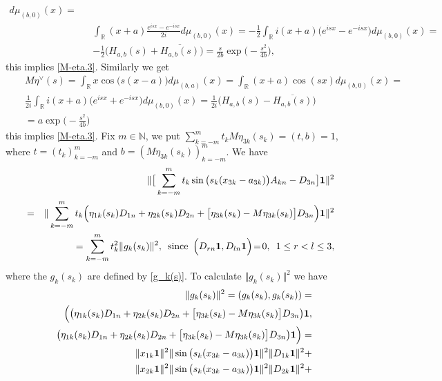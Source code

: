 \documentclass[preprint,12pt]{elsarticle}
\numberwithin{equation}{section}
\begin{document}
\begin{pf}
\begin{eqnarray*}
d\mu_{(b,0)}(x)=\\
&&
\int_{\mathbb R}(x+a)\frac{e^{isx}-e^{-isx}}{2i}d\mu_{(b,0)}(x)=
-\frac{1}{2}\int_{\mathbb R}i(x+a)\big(e^{isx}-e^{-isx}\big)d\mu_{(b,0)}(x)=\\
&&
-\frac{1}{2}\Big(H_{a,b}(s)+\overline{H_{a,b}(s)}\Big)=\frac{s}{2b}\exp\Big(-\frac{s^2}{4b}\Big),
\end{eqnarray*}
this implies \eqref{M-eta.3}.
Similarly we get 
\begin{eqnarray*}
&&
M\eta^{\vee}(s)=
\int_{\mathbb R}x\cos\big(s(x-a)\big)d\mu_{(b,a)}(x)=
\int_{\mathbb R}(x+a)\cos(sx)
d\mu_{(b,0)}(x)=\\
&&
\frac{1}{2i}\int_{\mathbb R}i(x+a)\Big(e^{isx}+e^{-isx}\Big)d\mu_{(b,0)}(x)=
\frac{1}{2i}\Big(H_{a,b}(s)-\overline{H_{a,b}(s)}\Big)\\
&&
=a\exp\Big(-\frac{s^2}{4b}\Big)
\end{eqnarray*}
this implies \eqref{M-eta.3}.
Fix $m\in {\mathbb N}$, 
we put $\sum_{k=-m}^mt_kM\eta_{3k}(s_k)=(t,b)=1$,
where $t=(t_k)_{k=-m}^m$ and $b=(M\eta_{3k}(s_k))_{k=-m}^m$. We have
%
\begin{eqnarray}
\nonumber
&& \Vert \big[\sum_{k=-m}^mt_k
\sin\big(s_k(x_{3k}-a_{3k})\big)A_{kn}
-D_{3n}\big]{\bf 1}
\Vert^2\\
\nonumber
&=&
\Vert 
\sum_{k=-m}^mt_k
\Big(\eta_{1k}(s_k)D_{1n}+\eta_{2k}(s_k)D_{2n}+\big[\eta_{3k}(s_k)-M\eta_{3k}(s_k)\big]D_{3n}\Big){\bf 1}
\Vert^2
\\
\label{eta.3}
&&
=\sum_{k=-m}^mt^2_k\Vert g_{k}(s_k)\Vert^2,\,\,\,\text{since}\,\,\,
\Big(D_{rn}{\bf 1},D_{ln}{\bf 1}\Big)\!=\!0,\,\,\,1\leq r<l\leq 3,
\end{eqnarray} 
where the $g_k(s_k)$ are defined by \eqref{g_k(s)}.
To calculate $\Vert g_{k}(s_k)\Vert^2$ we have
\begin{eqnarray}
\nonumber
&&
\Vert g_{k}(s_k)\Vert^2=(g_{k}(s_k),g_{k}(s_k))=\\
\nonumber
&&\Big(\big(\eta_{1k}(s_k)D_{1n}+\eta_{2k}(s_k)D_{2n}+\big[\eta_{3k}(s_k)-M\eta_{3k}(s_k)\big]D_{3n}\big){\bf 1},\\
\nonumber
&&\big(\eta_{1k}(s_k)D_{1n}+\eta_{2k}(s_k)D_{2n}+\big[\eta_{3k}(s_k)-M\eta_{3k}(s_k)\big]D_{3n}\big){\bf 1}\Big)=\\
\nonumber
&&
\Vert x_{1k}{\bf 1}\Vert^2
\Vert 
\sin\big(s_k(x_{3k}-a_{3k})\big){\bf 1}\Vert^2
\Vert D_{1k}{\bf 1}\Vert^2+\\
\nonumber
&&
\Vert x_{2k}{\bf 1}\Vert^2
\Vert \sin\big(s_k(x_{3k}-a_{3k})\big){\bf 1}\Vert^2
\Vert D_{2k}{\bf 1}\Vert^2+\\

\end{eqnarray}
\end{pf}
\end{document}
